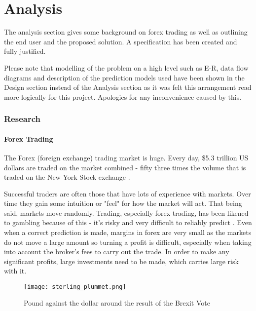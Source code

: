 \newpage
\part{Analysis}

    \graphicspath{{images/analysis/}}

    The analysis section gives some background on forex trading as well as outlining the end user and the proposed solution. A specification has been created and fully justified.

    Please note that modelling of the problem on a high level such as E-R, data flow diagrams and description of the prediction models used have been shown in the Design section instead of the Analysis section as it was felt this arrangement read more logically for this project. Apologies for any inconvenience caused by this.

    \section{Research}
    
        \subsection{Forex Trading}

        The Forex (foreign exchange) trading market is huge. Every day, \$5.3 trillion US dollars are traded on the market combined - fifty three times the volume that is traded on the New York Stock exchange \cite{brokernotes_2018}.
        
        Successful traders are often those that have lots of experience with markets. Over time they gain some intuition or "feel" for how the market will act. That being said, markets move randomly. Trading, especially forex trading, has been likened to gambling because of this - it's risky and very difficult to reliably predict \cite{hannah_2017}. Even when a correct prediction is made, margins in forex are very small as the markets do not move a large amount so turning a profit is difficult, especially when taking into account the broker's fees to carry out the trade. In order to make any significant profits, large investments need to be made, which carries large risk with it.

        \begin{figure}[htbp]
            \centering
            \texttt{[image: sterling\_plummet.png]}
            \caption{Pound against the dollar around the result of the Brexit Vote \cite{bbc_news_2016}}
            \label{fig:sterling_plummet}
        \end{figure}

